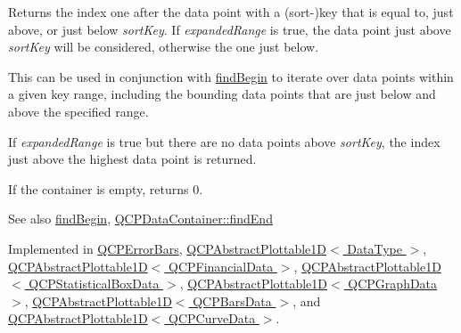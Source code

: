 Returns the index one after the data point with a (sort-\/)key that is equal to, just above, or just below {\itshape sort\+Key}. If {\itshape expanded\+Range} is true, the data point just above {\itshape sort\+Key} will be considered, otherwise the one just below.

This can be used in conjunction with \hyperlink{class_q_c_p_plottable_interface1_d_a5b95783271306a4de97be54eac1e7d13}{find\+Begin} to iterate over data points within a given key range, including the bounding data points that are just below and above the specified range.

If {\itshape expanded\+Range} is true but there are no data points above {\itshape sort\+Key}, the index just above the highest data point is returned.

If the container is empty, returns 0.

\begin{DoxySeeAlso}{See also}
\hyperlink{class_q_c_p_plottable_interface1_d_a5b95783271306a4de97be54eac1e7d13}{find\+Begin}, \hyperlink{class_q_c_p_data_container_afb8b8f23cc2b7234a793a25ce79fe48f}{Q\+C\+P\+Data\+Container\+::find\+End} 
\end{DoxySeeAlso}


Implemented in \hyperlink{class_q_c_p_error_bars_a64629f13bb290d41dd8f1b37346bfdd4}{Q\+C\+P\+Error\+Bars}, \hyperlink{class_q_c_p_abstract_plottable1_d_ad913df7f02add35150779dce3913aeae}{Q\+C\+P\+Abstract\+Plottable1\+D$<$ Data\+Type $>$}, \hyperlink{class_q_c_p_abstract_plottable1_d_ad913df7f02add35150779dce3913aeae}{Q\+C\+P\+Abstract\+Plottable1\+D$<$ Q\+C\+P\+Financial\+Data $>$}, \hyperlink{class_q_c_p_abstract_plottable1_d_ad913df7f02add35150779dce3913aeae}{Q\+C\+P\+Abstract\+Plottable1\+D$<$ Q\+C\+P\+Statistical\+Box\+Data $>$}, \hyperlink{class_q_c_p_abstract_plottable1_d_ad913df7f02add35150779dce3913aeae}{Q\+C\+P\+Abstract\+Plottable1\+D$<$ Q\+C\+P\+Graph\+Data $>$}, \hyperlink{class_q_c_p_abstract_plottable1_d_ad913df7f02add35150779dce3913aeae}{Q\+C\+P\+Abstract\+Plottable1\+D$<$ Q\+C\+P\+Bars\+Data $>$}, and \hyperlink{class_q_c_p_abstract_plottable1_d_ad913df7f02add35150779dce3913aeae}{Q\+C\+P\+Abstract\+Plottable1\+D$<$ Q\+C\+P\+Curve\+Data $>$}.

\mbox{\label{class_q_c_p_plottable_interface1_d_a67093e4ccf490ff5f7750640941ff34c}} 
